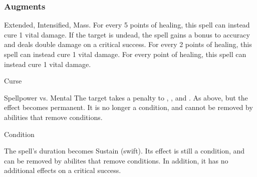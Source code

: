 \subsubsection{Augments}
 Extended, Intensified, Mass.
For every 5 points of healing, this spell can instead cure 1 vital damage.
If the target is undead, the spell gains a  bonus to accuracy and deals double damage on a critical success.
For every 2 points of healing, this spell can instead cure 1 vital damage.
For every point of healing, this spell can instead cure 1 vital damage.
\begin{spellsection}{Curse}
\begin{spellheader}
\end{spellheader}
\begin{spellcontent}
\begin{spelltargetinginfo}
\end{spelltargetinginfo}
\begin{spelleffects}
\begin{spellattack}{Spellpower vs. Mental}
\spellsuccess
The target takes a  penalty to , , and .
\spellcritical
As above, but the effect becomes permanent.
It is no longer a condition, and cannot be removed by abilities that remove conditions.
\end{spellattack}
\spelldur Condition
\end{spelleffects}
\end{spellcontent}
\begin{spellfooter}
\spellnotes \cursespellnotes
\miscastexplode
\end{spellfooter}
\begin{spellcantrip}
The spell's duration becomes Sustain (swift).
Its effect is still a condition, and can be removed by abilites that remove conditions.
In addition, it has no additional effects on a critical success.
\end{spellcantrip}
\end{spellsection}

